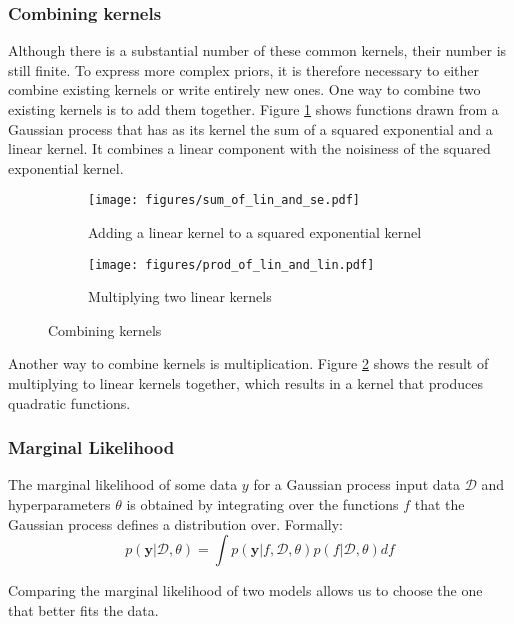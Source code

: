 \documentclass[a4paper,12pt,twoside,openright]{report}
\begin{document}
\subsubsection{Combining kernels}
Although there is a substantial number of these common kernels, their number is still finite. To express more complex priors, it is therefore necessary to either combine existing kernels or write entirely new ones. One way to combine two existing kernels is to add them together. Figure \ref{sum_of_lin_and_se} shows functions drawn from a Gaussian process that has as its kernel the sum of a squared exponential and a linear kernel. It combines a linear component with the noisiness of the squared exponential kernel.

\begin{figure}[h!]
\centering
\begin{subfigure}{.45\textwidth}
\centering
  \texttt{[image: figures/sum\_of\_lin\_and\_se.pdf]}
  \caption{Adding a linear kernel to a squared exponential kernel}
  \label{sum_of_lin_and_se}
\end{subfigure}
\begin{subfigure}{.45\textwidth}
\centering
  \texttt{[image: figures/prod\_of\_lin\_and\_lin.pdf]}
  \caption{Multiplying two linear kernels}
  \label{prod_of_lin_and_lin}
\end{subfigure}
\caption{Combining kernels}
\label{combining_kernels}
\end{figure}

Another way to combine kernels is multiplication. Figure \ref{prod_of_lin_and_lin} shows the result of multiplying to linear kernels together, which results in a kernel that produces quadratic functions.



\subsubsection{Marginal Likelihood}
The marginal likelihood of some data $y$ for a Gaussian process input data $\mathcal{D}$ and hyperparameters $\theta$ is obtained by integrating over the functions $f$ that the Gaussian process defines a distribution over. Formally:
\begin{equation}
p(\mathbf{y}|\mathcal{D}, \theta) = \int p(\mathbf{y}|f, \mathcal{D}, \theta)p(f|\mathcal{D}, \theta) df
\end{equation}

Comparing the marginal likelihood of two models allows us to choose the one that better fits the data.
\end{document}
